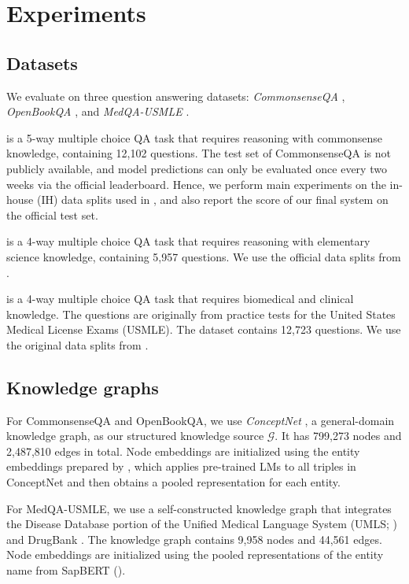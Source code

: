 \section{Experiments}\label{sec:experiment}
\subsection{Datasets}
We evaluate \methodname on three question answering datasets: \textit{CommonsenseQA} \cite{talmor2018commonsenseqa}, \textit{OpenBookQA} \cite{obqa}, and \textit{MedQA-USMLE} \cite{jin2021disease}.

 is a 5-way multiple choice QA task that requires reasoning with commonsense knowledge, containing 12,102 questions.
The test set of CommonsenseQA is not publicly available, and model predictions can only be evaluated once every two weeks via the official leaderboard. Hence, we perform main experiments on the {in-house (IH) data splits} used in \citet{lin2019kagnet}, and also report the score of our final system on the {official test} set.

 is a 4-way multiple choice QA task that requires reasoning with elementary science knowledge, containing 5,957 questions. We use the official data splits from \citet{mihaylov2018knowledgeable}. 

 is a 4-way multiple choice QA task that requires biomedical and clinical knowledge. The questions are originally from practice tests for the United States Medical License Exams (USMLE). The dataset contains 12,723 questions. We use the original data splits from \citet{jin2021disease}.


\subsection{Knowledge graphs}
\label{sec:experiment-kg}
For CommonsenseQA and OpenBookQA, we use \textit{ConceptNet} \cite{speer2016conceptnet}, a general-domain knowledge graph, as our structured knowledge source $\mathcal{G}$. It has 799,273
nodes and 2,487,810 edges in total. Node embeddings are initialized using the entity embeddings prepared by \citet{feng2020scalable}, which applies pre-trained LMs to all triples in ConceptNet and then obtains a pooled representation for each entity.

For MedQA-USMLE, we use a self-constructed knowledge graph that integrates the Disease Database portion of the Unified Medical Language System (UMLS; \citealp{bodenreider2004unified}) and DrugBank \cite{wishart2018drugbank}. The knowledge graph contains 9,958 nodes and 44,561 edges. Node embeddings are initialized using the pooled representations of the entity name from SapBERT (\citealp{liu2020self}).

